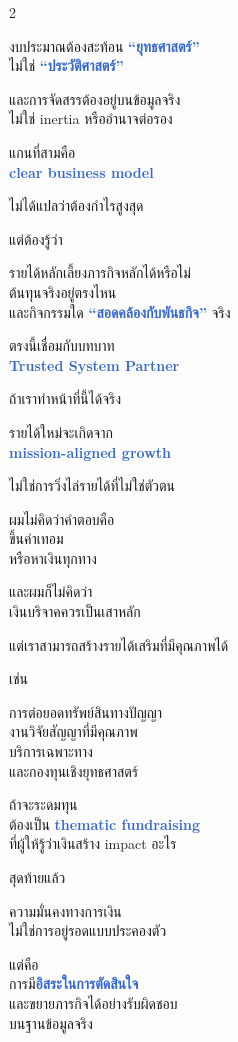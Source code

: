 \documentclass[10pt]{article}
\begin{document}
\begin{tcolorbox}[breakable,colback=panel,colframe=line,boxrule=0.5pt,arc=2mm,left=3mm,right=3mm,top=2mm,bottom=2mm]
\begin{multicols}{2}
\par งบประมาณต้องสะท้อน \textbf{\textcolor{highlight}{“ยุทธศาสตร์”}}\\ ไม่ใช่ \textbf{\textcolor{highlight}{“ประวัติศาสตร์”}}
\par และการจัดสรรต้องอยู่บนข้อมูลจริง\\ ไม่ใช่ inertia หรืออำนาจต่อรอง
\par แกนที่สามคือ\\ \textbf{\textcolor{highlight}{clear business model}}
\par ไม่ได้แปลว่าต้องกำไรสูงสุด
\par แต่ต้องรู้ว่า
\par รายได้หลักเลี้ยงภารกิจหลักได้หรือไม่\\ ต้นทุนจริงอยู่ตรงไหน\\ และกิจกรรมใด \textbf{\textcolor{highlight}{“สอดคล้องกับพันธกิจ”}} จริง
\par ตรงนี้เชื่อมกับบทบาท\\ \textbf{\textcolor{highlight}{Trusted System Partner}}
\par ถ้าเราทำหน้าที่นี้ได้จริง
\par รายได้ใหม่จะเกิดจาก\\ \textbf{\textcolor{highlight}{mission-aligned growth}}
\par ไม่ใช่การวิ่งไล่รายได้ที่ไม่ใช่ตัวตน
\par ผมไม่คิดว่าคำตอบคือ\\ ขึ้นค่าเทอม\\ หรือหาเงินทุกทาง
\par และผมก็ไม่คิดว่า\\ เงินบริจาคควรเป็นเสาหลัก
\par แต่เราสามารถสร้างรายได้เสริมที่มีคุณภาพได้
\par เช่น
\par การต่อยอดทรัพย์สินทางปัญญา\\ งานวิจัยสัญญาที่มีคุณภาพ\\ บริการเฉพาะทาง\\ และกองทุนเชิงยุทธศาสตร์
\par ถ้าจะระดมทุน\\ ต้องเป็น \textbf{\textcolor{highlight}{thematic fundraising}}\\ ที่ผู้ให้รู้ว่าเงินสร้าง impact อะไร
\par สุดท้ายแล้ว
\par ความมั่นคงทางการเงิน\\ ไม่ใช่การอยู่รอดแบบประคองตัว
\par แต่คือ\\ การมี\textbf{\textcolor{highlight}{อิสระในการตัดสินใจ}}\\ และขยายภารกิจได้อย่างรับผิดชอบ\\ บนฐานข้อมูลจริง
\end{multicols}
\end{tcolorbox}
\end{document}
